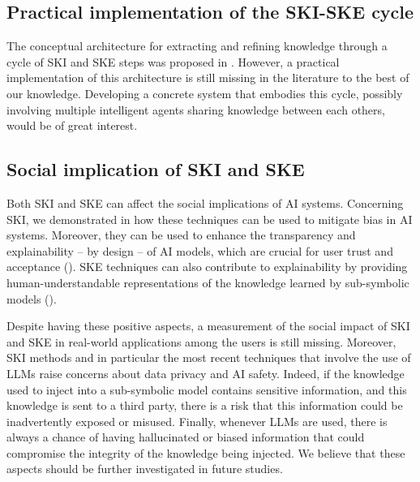 \subsection*{Practical implementation of the \gls{SKI}-\gls{SKE} cycle}
%
The conceptual architecture for extracting and refining knowledge through a cycle of \gls{SKI} and \gls{SKE} steps was proposed in .
%
However, a practical implementation of this architecture is still missing in the literature to the best of our knowledge.
%
Developing a concrete system that embodies this cycle, possibly involving multiple intelligent agents sharing knowledge between each others, would be of great interest.


\subsection*{Social implication of \gls{SKI} and \gls{SKE}}
%
Both \gls{SKI} and \gls{SKE} can affect the social implications of \gls{AI} systems.
%
Concerning \gls{SKI}, we demonstrated in  how these techniques can be used to mitigate bias in \gls{AI} systems.
%
Moreover, they can be used to enhance the transparency and explainability -- by design -- of \gls{AI} models, which are crucial for user trust and acceptance ().
%
\Gls{SKE} techniques can also contribute to explainability by providing human-understandable representations of the knowledge learned by sub-symbolic models ().

Despite having these positive aspects, a measurement of the social impact of \gls{SKI} and \gls{SKE} in real-world applications among the users is still missing.
%
Moreover, \gls{SKI} methods and in particular the most recent techniques that involve the use of \glspl{LLM} raise concerns about data privacy and \gls{AI} safety.
%
Indeed, if the knowledge used to inject into a sub-symbolic model contains sensitive information, and this knowledge is sent to a third party, there is a risk that this information could be inadvertently exposed or misused.
%
Finally, whenever \glspl{LLM} are used, there is always a chance of having hallucinated or biased information that could compromise the integrity of the knowledge being injected.
%
We believe that these aspects should be further investigated in future studies.


